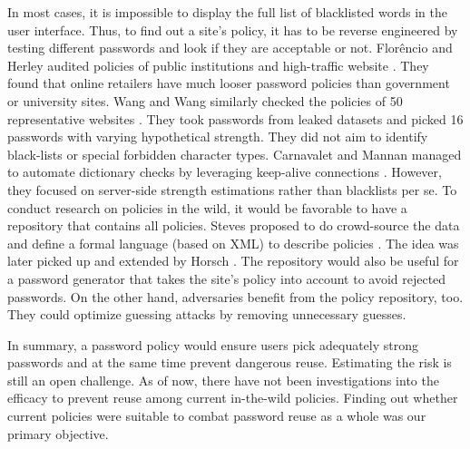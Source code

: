 In most cases, it is impossible to display the full list of blacklisted words in the user interface. Thus, to find out a site's policy, it has to be reverse engineered by testing different passwords and look if they are acceptable or not. Florêncio and Herley audited policies of public institutions and high-traffic website \cite{Florencio2010WhereDoPoliciesComeFrom}. They found that online retailers have much looser password policies than government or university sites. Wang and Wang similarly checked the policies of 50 representative websites \cite{Wang2015EmperorsPolicies}. They took passwords from leaked datasets and picked 16 passwords with varying hypothetical strength. They did not aim to identify black-lists or special forbidden character types. Carnavalet and Mannan managed to automate dictionary checks by leveraging keep-alive connections \cite{Carnavalet2014AnalyzingPWStrengthMeters}. However, they focused on server-side strength estimations rather than blacklists per se. To conduct research on policies in the wild, it would be favorable to have a repository that contains all policies. Steves \etal proposed to do crowd-source the data and define a formal language (based on XML) to describe policies \cite{Steves2015PasswordPolicyLanguage}. The idea was later picked up and extended by Horsch \etal \cite{Horsch2016PasswordPolicyMarkup}. The repository would also be useful for a password generator that takes the site's policy into account to avoid rejected passwords. On the other hand, adversaries benefit from the policy repository, too. They could optimize guessing attacks by removing unnecessary guesses. 

In summary, a password policy would ensure users pick adequately strong passwords and at the same time prevent dangerous reuse. Estimating the risk is still an open challenge. As of now, there have not been investigations into the efficacy to prevent reuse among current in-the-wild policies. Finding out whether current policies were suitable to combat password reuse as a whole was our primary objective. 

